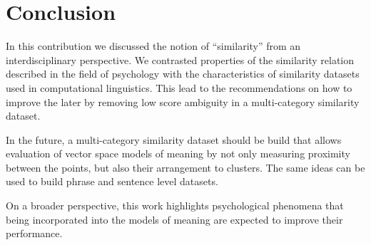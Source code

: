 \documentclass[11pt]{article}
\begin{document}

%

\section{Conclusion}

In this contribution we discussed the notion of ``similarity'' from an interdisciplinary perspective. We contrasted properties of the similarity relation described in the field of psychology with the characteristics of similarity datasets used in computational linguistics. This lead to the recommendations on how to improve the later by removing low score ambiguity in a multi-category similarity dataset.

In the future, a multi-category similarity dataset should be build that allows evaluation of vector space models of meaning by not only measuring proximity between the points, but also their arrangement to clusters. The same ideas can be used to build phrase and sentence level datasets.


On a broader perspective, this work highlights psychological phenomena that being incorporated into the models of meaning are expected to improve their performance.

\balance


\end{document}
